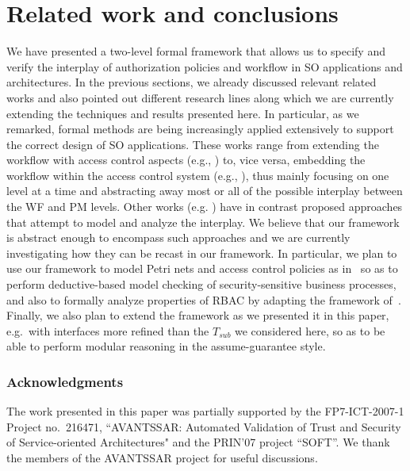 \documentclass[conference]{IEEEtran}
\begin{document}
\section{Related work and conclusions}\label{sec:conclusions}

We have presented a two-level formal framework that allows us to specify and verify the interplay of authorization policies and workflow in SO applications and architectures. 
In the previous sections, we already discussed relevant related works
and also pointed out different research lines along which we are
currently extending the techniques and results presented here.  In
particular, as we remarked, formal methods are being increasingly
applied extensively to support the correct design of SO
applications. These works range from extending the workflow with
access control aspects (e.g.,
\cite{BertinoCramptonPaci06,PaciBertinoCrampton08}) to, vice versa,
embedding the workflow within the access control system (e.g.,
\cite{SecPAL-homepage, fisler06,DKAL-homepage,ryan05}), thus mainly
focusing on one level at a time and abstracting away most or all of
the possible interplay between the WF and PM levels. Other works
(e.g. \cite{armando-ponta09,bcm-aimsa08,BalbianiChevalierElHouri-framework,schaad})
have in contrast proposed approaches that attempt to model and analyze
the interplay. We believe that our framework is abstract enough to
encompass such approaches and we are currently investigating how they
can be recast in our framework. In particular, we plan to use our
framework to model Petri nets and access control policies as
in~\cite{armando-ponta09} so as to perform deductive-based model
checking of security-sensitive business processes, and also to
formally analyze properties of RBAC by adapting the framework
of~\cite{bcm-aimsa08,BalbianiChevalierElHouri-framework}.  Finally, we
also plan to extend the framework as we presented it in this paper,
e.g.~with interfaces more refined than the $T_\mathit{sub}$ we
considered here, so 
as to be able to perform modular reasoning in the assume-guarantee
style.


\subsubsection*{Acknowledgments}
The work presented in this paper
was partially supported by the FP7-ICT-2007-1 Project no.~216471,
``AVANTSSAR: Automated Validation of Trust and Security of
Service-oriented Architectures" and the PRIN'07 project ``SOFT''. We
thank the members of the AVANTSSAR project for useful discussions.
\end{document}
